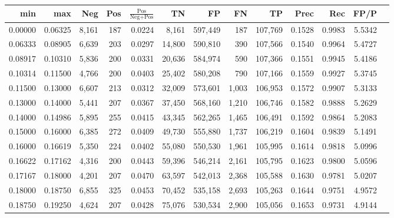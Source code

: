 \begin{tabular}{rrrrrrrrrrrrr}
\toprule
    min &     max &   Neg & Pos & $\frac{\text{Pos}}{\text{Neg}+\text{Pos}}$ &      TN &      FP &      FN &      TP &   Prec &    Rec &   FP/P \\
\midrule
0.00000 & 0.06325 & 8,161 & 187 &                                     0.0224 &   8,161 & 597,449 &     187 & 107,769 & 0.1528 & 0.9983 & 5.5342 \\
0.06333 & 0.08905 & 6,639 & 203 &                                     0.0297 &  14,800 & 590,810 &     390 & 107,566 & 0.1540 & 0.9964 & 5.4727 \\
0.08917 & 0.10310 & 5,836 & 200 &                                     0.0331 &  20,636 & 584,974 &     590 & 107,366 & 0.1551 & 0.9945 & 5.4186 \\
0.10314 & 0.11500 & 4,766 & 200 &                                     0.0403 &  25,402 & 580,208 &     790 & 107,166 & 0.1559 & 0.9927 & 5.3745 \\
0.11500 & 0.13000 & 6,607 & 213 &                                     0.0312 &  32,009 & 573,601 &   1,003 & 106,953 & 0.1572 & 0.9907 & 5.3133 \\
0.13000 & 0.14000 & 5,441 & 207 &                                     0.0367 &  37,450 & 568,160 &   1,210 & 106,746 & 0.1582 & 0.9888 & 5.2629 \\
0.14000 & 0.14986 & 5,895 & 255 &                                     0.0415 &  43,345 & 562,265 &   1,465 & 106,491 & 0.1592 & 0.9864 & 5.2083 \\
0.15000 & 0.16000 & 6,385 & 272 &                                     0.0409 &  49,730 & 555,880 &   1,737 & 106,219 & 0.1604 & 0.9839 & 5.1491 \\
0.16000 & 0.16619 & 5,350 & 224 &                                     0.0402 &  55,080 & 550,530 &   1,961 & 105,995 & 0.1614 & 0.9818 & 5.0996 \\
0.16622 & 0.17162 & 4,316 & 200 &                                     0.0443 &  59,396 & 546,214 &   2,161 & 105,795 & 0.1623 & 0.9800 & 5.0596 \\
0.17167 & 0.18000 & 4,201 & 207 &                                     0.0470 &  63,597 & 542,013 &   2,368 & 105,588 & 0.1630 & 0.9781 & 5.0207 \\
0.18000 & 0.18750 & 6,855 & 325 &                                     0.0453 &  70,452 & 535,158 &   2,693 & 105,263 & 0.1644 & 0.9751 & 4.9572 \\
0.18750 & 0.19250 & 4,624 & 207 &                                     0.0428 &  75,076 & 530,534 &   2,900 & 105,056 & 0.1653 & 0.9731 & 4.9144 \\

\end{tabular}
